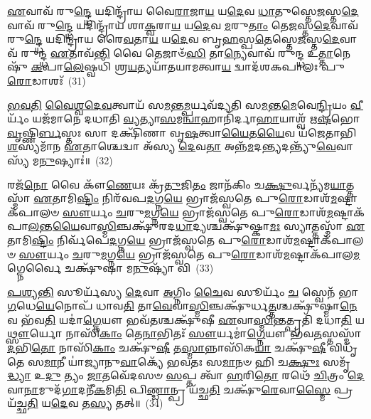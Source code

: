 \-\ul{𑌏}\-𑌵𑌾𑌵᳴ 𑌰𑍁\-\ul{𑌨𑍍𑌦𑍍𑌧𑍇} 𑌯𑌦𑌿𑌨𑍍𑌦𑍍𑌰𑌾᳴𑌯 𑌵𑍈\-\ul{𑌰𑌾}\-𑌜𑌾\-\ul{𑌯} 𑌯\-\ul{𑌦𑍇}\-𑌵 \ul{𑌧𑌾}\-𑌤𑍁𑌸𑍍𑌤𑍇\-\ul{𑌜}\-𑌸𑍍𑌤\-\ul{𑌦𑍇}\-𑌵𑌾𑌵᳴ 𑌰𑍁\-\ul{𑌨𑍍𑌦𑍍𑌧𑍇} 𑌯𑌦𑌿𑌨𑍍𑌦𑍍𑌰𑌾᳴𑌯 𑌶𑌾\-\ul{𑌕𑍍𑌵}\-𑌰𑌾\-\ul{𑌯} 𑌯\-\ul{𑌦𑍇}\-𑌵 \ul{𑌮}\-𑌰𑍁\-\ul{𑌤𑌾𑌂} 𑌤𑍇\-\ul{𑌜}\-𑌸𑍍𑌤\-\ul{𑌦𑍇}\-𑌵𑌾𑌵᳴ 𑌰𑍁\-\ul{𑌨𑍍𑌦𑍍𑌧𑍇} 𑌯𑌦𑌿𑌨𑍍𑌦𑍍𑌰𑌾᳴𑌯 𑌰𑍈\-\ul{𑌵}\-𑌤𑌾\-\ul{𑌯} 𑌯\-\ul{𑌦𑍇}\-𑌵 𑌬𑍃\-\ul{𑌹}\-𑌸𑍍𑌪\-\ul{𑌤𑍇}\-𑌸𑍍𑌤𑍇\-\ul{𑌜}\-𑌸𑍍𑌤\-\ul{𑌦𑍇}\-𑌵𑌾𑌵᳴ 𑌰𑍁𑌨𑍍𑌦𑍍𑌧 \ul{𑌏}\-𑌤𑌾𑌵᳴\-\ul{𑌨𑍍𑌤𑌿} 𑌵𑍈 𑌤𑍇𑌜𑌾𑍞᳴\-\ul{𑌸𑌿} 𑌤𑌾\-\ul{𑌨𑍍𑌯𑍇}\-𑌵𑌾𑌵᳴ 𑌰𑍁𑌨𑍍𑌦𑍍𑌧 𑌉\-\ul{𑌤𑍍𑌤𑌾}\-𑌨𑍇𑌷𑍁᳴ \ul{𑌕}\-𑌪𑌾\-\ul{𑌲𑍇}\-𑌷𑍍𑌵𑌧𑌿᳴ 𑌶𑍍𑌰\-\ul{𑌯}\-𑌤𑍍𑌯𑌯𑌾᳴𑌤𑌯𑌾𑌮𑌤𑍍𑌵𑌾\-\ul{𑌯} 𑌦𑍍𑌵𑌾𑌦᳴𑌶\-𑌕𑌪𑌾𑌲𑌃 𑌪𑍁\-\ul{𑌰𑍋}\-𑌡𑌾𑌶𑌃᳴~(31)

\-\ul{𑌭}\-\-\ul{𑌵}\-\-\ul{𑌤𑌿} \ul{𑌵𑍈}\-\-\ul{𑌶𑍍𑌵}\-\-\ul{𑌦𑍇}\-\-\ul{𑌵}\-𑌤𑍍𑌵𑌾𑌯᳴ 𑌸\-\ul{𑌮}\-𑌨𑍍𑌤\-\ul{𑌮𑍍𑌪}\-𑌰𑍍𑌯𑌵᳴𑌦𑍍𑌯𑌤𑌿 𑌸\-\ul{𑌮}\-𑌨𑍍𑌤\-\ul{𑌮𑍇}\-𑌵𑍇\-\ul{𑌨𑍍𑌦𑍍𑌰𑌿}\-𑌯𑌂 \ul{𑌵𑍀}\-𑌰𑍍𑌯𑌂᳴ 𑌯𑌜᳴𑌮𑌾𑌨𑍇 𑌦𑌧𑌾𑌤𑌿 \ul{𑌵𑍍𑌯}\-𑌤𑍍𑌯𑌾\-\ul{𑌸}\-𑌮\-\ul{𑌨𑍍𑌵𑌾}\-𑌹𑌾𑌨𑌿᳴𑌰𑍍𑌦𑌾\-\ul{𑌹𑌾}\-𑌯𑌾𑌶𑍍𑌵᳴ 𑌋\-\ul{𑌷}\-𑌭𑍋 \ul{𑌵𑍃}\-𑌷𑍍𑌣𑌿\-\ul{𑌰𑍍𑌬}\-𑌸𑍍𑌤𑌃 𑌸𑌾 𑌦𑌕𑍍𑌷𑌿᳴𑌣𑌾 𑌵𑍃\-\ul{𑌷}\-𑌤𑍍𑌵𑌾\-\ul{𑌯𑍈}\-𑌤\-\ul{𑌯𑍈}\-𑌵 𑌯᳴𑌜𑍇𑌤𑌾𑌭𑌿\-\ul{𑌶}\-𑌸𑍍𑌯𑌮𑌾᳴𑌨 \ul{𑌏}\-𑌤𑌾𑌶𑍍𑌚𑍇𑌦𑍍𑌵𑌾 𑌅᳴𑌸𑍍𑌯 \ul{𑌦𑍇}\-𑌵\-\ul{𑌤𑌾} 𑌅𑌨𑍍𑌨᳴\-\ul{𑌮}\-𑌦\-\ul{𑌨𑍍𑌤𑍍𑌯}\-𑌦𑌨𑍍𑌤𑍍𑌯𑍁᳴\-\ul{𑌵𑍇}\-𑌵𑌾𑌸𑍍𑌯᳴ 𑌮\-\ul{𑌨𑍁}\-𑌷𑍍𑌯𑌾𑌃॑॥~(32)

{\anuvakamend[{\-\ul{𑌇}\-\-\ul{𑌨𑍍𑌦𑍍𑌰𑌿}\-𑌯𑌕𑌾᳴𑌮𑌃 𑌸\-\ul{𑌵𑌿}\-𑌤𑍁𑌸𑍍𑌤𑍇\-\ul{𑌜}\-𑌸𑍍𑌤𑌤𑍍𑌪𑍁᳴\-\ul{𑌰𑍋}\-𑌡𑌾\-\ul{𑌶𑍋}\-\-𑌽𑌷𑍍𑌟𑌾𑌤𑍍𑌰𑌿𑍞᳴𑌶𑌚𑍍𑌚}]}%

𑌰𑌜᳴\-\ul{𑌨𑍋} 𑌵𑍈 𑌕𑍗᳴\-\ul{𑌣𑍇}\-𑌯𑌃 𑌕𑍍𑌰᳴\-\ul{𑌤𑍁}\-𑌜𑌿\-\ul{𑌤𑌂} 𑌜𑌾𑌨᳴𑌕𑌿𑌂 𑌚\-\ul{𑌕𑍍𑌷𑍁}\-𑌰𑍍𑌵𑌨𑍍𑌯᳴𑌮\-\ul{𑌯𑌾}\-𑌤𑍍𑌤𑌸𑍍𑌮𑌾᳴ \ul{𑌏}\-𑌤𑌾𑌮𑌿\-\ul{𑌷𑍍𑌟𑌿𑌂} 𑌨𑌿𑌰᳴𑌵𑌪\-\ul{𑌦}\-𑌗𑍍𑌨\-\ul{𑌯𑍇} 𑌭𑍍𑌰𑌾𑌜᳴𑌸𑍍𑌵𑌤𑍇 𑌪𑍁\-\ul{𑌰𑍋}\-𑌡𑌾𑌶᳴\-\-\ul{𑌮}\-𑌷𑍍𑌟𑌾𑌕᳴𑌪𑌾𑌲𑍞 \ul{𑌸𑍗}\-𑌰𑍍𑌯𑌂 \ul{𑌚}\-𑌰𑍁\-\ul{𑌮}\-𑌗𑍍𑌨\-\ul{𑌯𑍇} 𑌭𑍍𑌰𑌾𑌜᳴𑌸𑍍𑌵𑌤𑍇 𑌪𑍁\-\ul{𑌰𑍋}\-𑌡𑌾𑌶᳴\-\-\ul{𑌮}\-𑌷𑍍𑌟𑌾𑌕᳴𑌪𑌾\-\ul{𑌲}\-𑌨𑍍𑌤\-\ul{𑌯𑍈}\-𑌵𑌾\-\ul{𑌸𑍍𑌮𑌿}\-𑌞𑍍𑌚𑌕𑍍𑌷𑍁᳴𑌰𑌦\-\ul{𑌧𑌾}\-𑌦𑍍𑌯𑌶𑍍𑌚𑌕𑍍𑌷𑍁᳴𑌷𑍍𑌕𑌾\-\ul{𑌮𑌃} 𑌸𑍍𑌯𑌾𑌤𑍍𑌤𑌸𑍍𑌮𑌾᳴ \ul{𑌏}\-𑌤𑌾𑌮𑌿\-\ul{𑌷𑍍𑌟𑌿𑌂} 𑌨𑌿𑌰𑍍𑌵᳴𑌪𑍇\-\ul{𑌦}\-𑌗𑍍𑌨\-\ul{𑌯𑍇} 𑌭𑍍𑌰𑌾𑌜᳴𑌸𑍍𑌵𑌤𑍇 𑌪𑍁\-\ul{𑌰𑍋}\-𑌡𑌾𑌶᳴\-\-\ul{𑌮}\-𑌷𑍍𑌟𑌾𑌕᳴𑌪𑌾𑌲𑍞 \ul{𑌸𑍗}\-𑌰𑍍𑌯𑌂 \ul{𑌚}\-𑌰𑍁\-\ul{𑌮}\-𑌗𑍍𑌨\-\ul{𑌯𑍇} 𑌭𑍍𑌰𑌾𑌜᳴𑌸𑍍𑌵𑌤𑍇 𑌪𑍁\-\ul{𑌰𑍋}\-𑌡𑌾𑌶᳴\-\-\ul{𑌮}\-𑌷𑍍𑌟𑌾𑌕᳴𑌪𑌾𑌲\-\ul{𑌮}\-𑌗𑍍𑌨𑍇𑌰𑍍𑌵𑍈 𑌚𑌕𑍍𑌷𑍁᳴𑌷𑌾 𑌮\-\ul{𑌨𑍁}\-𑌷𑍍𑌯𑌾᳴ 𑌵𑌿~(33)

\-\ul{𑌪}\-\-\ul{𑌶𑍍𑌯}\-\-\ul{𑌨𑍍𑌤𑌿} 𑌸𑍂𑌰𑍍𑌯᳴𑌸𑍍𑌯 \ul{𑌦𑍇}\-𑌵𑌾 \ul{𑌅}\-𑌗𑍍𑌨𑌿𑌂 \ul{𑌚𑍈}\-𑌵 𑌸𑍂𑌰𑍍𑌯𑌂᳴ \ul{𑌚} 𑌸𑍍𑌵𑍇𑌨᳴ 𑌭𑌾\-\ul{𑌗}\-𑌧𑍇\-\ul{𑌯𑍇}\-𑌨𑍋𑌪᳴ 𑌧𑌾𑌵\-\ul{𑌤𑌿} 𑌤𑌾\-\ul{𑌵𑍇}\-𑌵𑌾\-\ul{𑌸𑍍𑌮𑌿}\-𑌞𑍍𑌚𑌕𑍍𑌷𑍁᳴𑌰𑍍𑌧\-\ul{𑌤𑍍𑌤}\-𑌶𑍍𑌚𑌕𑍍𑌷𑍁᳴𑌷𑍍𑌮𑌾\-\ul{𑌨𑍇}\-𑌵 𑌭᳴𑌵\-\ul{𑌤𑌿} 𑌯𑌦𑌾॑\-\ul{𑌗𑍍𑌨𑍇}\-𑌯𑍗 𑌭𑌵᳴\-\ul{𑌤}\-𑌶𑍍𑌚𑌕𑍍𑌷𑍁᳴𑌷𑍀 \ul{𑌏}\-𑌵𑌾\-\ul{𑌸𑍍𑌮𑌿}\-𑌨𑍍𑌤𑌤𑍍𑌪𑍍𑌰𑌤𑌿᳴ 𑌦𑌧𑌾\-\ul{𑌤𑌿} 𑌯\-\ul{𑌥𑍍𑌸𑍗}\-𑌰𑍍𑌯𑍋 𑌨𑌾𑌸𑌿᳴\-\ul{𑌕𑌾𑌂} 𑌤𑍇\-\ul{𑌨𑌾}\-𑌭𑌿𑌤𑌃᳴ \ul{𑌸𑍗}\-𑌰𑍍𑌯𑌮𑌾॑\-\ul{𑌗𑍍𑌨𑍇}\-𑌯𑍗 𑌭᳴𑌵\-\ul{𑌤}\-𑌸𑍍𑌤𑌸𑍍𑌮𑌾᳴\-\ul{𑌦}\-𑌭𑌿\-\ul{𑌤𑍋} 𑌨𑌾𑌸𑌿᳴\-\ul{𑌕𑌾𑌂} 𑌚𑌕𑍍𑌷𑍁᳴\-\ul{𑌷𑍀} 𑌤\-\ul{𑌸𑍍𑌮𑌾}\-𑌨𑍍𑌨𑌾𑌸𑌿᳴𑌕\-\ul{𑌯𑌾} 𑌚𑌕𑍍𑌷𑍁᳴\-\ul{𑌷𑍀} 𑌵𑌿𑌧𑍃᳴𑌤𑍇 𑌸\-\ul{𑌮𑌾}\-𑌨𑍀 𑌯𑌾॑𑌜𑍍𑌯𑌾𑌨𑍁\-\ul{𑌵𑌾}\-𑌕𑍍𑌯𑍇᳴ 𑌭𑌵𑌤𑌃 𑌸\-\ul{𑌮𑌾}\-𑌨𑍞 𑌹𑌿 𑌚\-\ul{𑌕𑍍𑌷𑍁𑌃} 𑌸𑌮𑍃᳴\-\ul{𑌦𑍍𑌧𑍍𑌯𑌾} 𑌉\-\ul{𑌦𑍁} 𑌤𑍍𑌯𑌂 \ul{𑌜𑌾}\-𑌤𑌵𑍇᳴𑌦𑌸𑍞 \ul{𑌸}\-𑌪𑍍𑌤 𑌤𑍍𑌵𑌾᳴ \ul{𑌹}\-𑌰𑌿\-\ul{𑌤𑍋} 𑌰𑌥𑍇᳴ \ul{𑌚𑌿}\-𑌤𑍍𑌰𑌂 \ul{𑌦𑍇}\-𑌵𑌾\-\ul{𑌨𑌾}\-𑌮𑍁𑌦᳴\-\ul{𑌗𑌾}\-𑌦𑌨𑍀᳴\-\ul{𑌕}\-𑌮𑌿\-\ul{𑌤𑌿} 𑌪𑌿\-\ul{𑌣𑍍𑌡𑌾}\-𑌨𑍍𑌪𑍍𑌰 𑌯᳴𑌚𑍍𑌛\-\ul{𑌤𑌿} 𑌚𑌕𑍍𑌷𑍁᳴\-\ul{𑌰𑍇}\-𑌵𑌾\-\ul{𑌸𑍍𑌮𑍈} 𑌪𑍍𑌰 𑌯᳴𑌚𑍍𑌛\-\ul{𑌤𑌿} 𑌯\-\ul{𑌦𑍇}\-𑌵 𑌤\-\ul{𑌸𑍍𑌯} 𑌤𑌤𑍍॥~(34)

